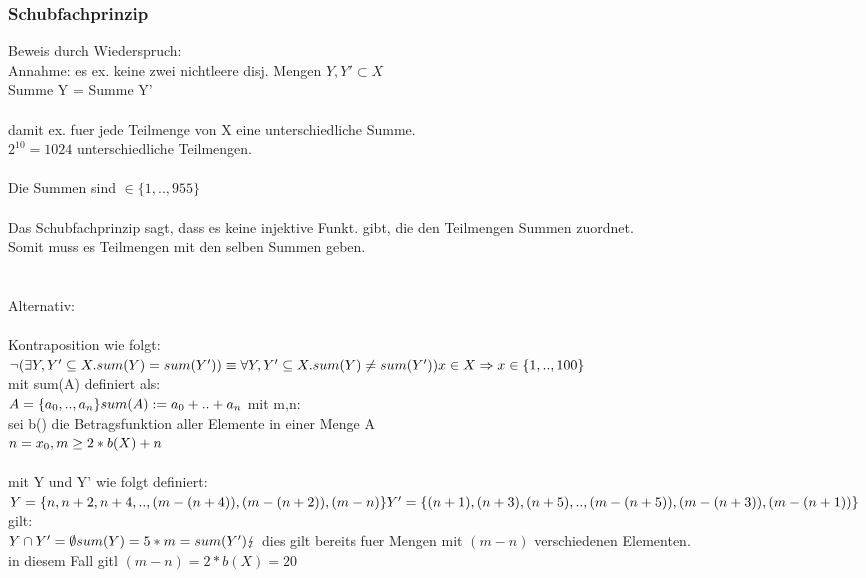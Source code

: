\documentclass{article}
\begin{document}
\subsubsection{Schubfachprinzip}
Beweis durch Wiederspruch:\\
Annahme: es ex. keine zwei nichtleere disj. Mengen $Y, Y' \subset X$\\
Summe Y = Summe Y'\\
\\
damit ex. fuer jede Teilmenge von X eine unterschiedliche Summe.\\
$2^{10} = 1024$ unterschiedliche Teilmengen.\\
\\
Die Summen sind $\in \{1,..,955\}$\\
\\
Das Schubfachprinzip sagt, dass es keine injektive Funkt. gibt, die den Teilmengen Summen zuordnet.\\
Somit muss es Teilmengen mit den selben Summen geben.
\\
\\
\\
Alternativ:\\
\\
Kontraposition wie folgt:
\\
$
        \neg (\exists Y,Y' \subseteq X. sum(Y) = sum(Y'))\\
\equiv  \forall Y,Y' \subseteq X. sum(Y) \neq sum(Y'))\\
\\
x \in X \Rightarrow x \in \{1,..,100\}\\
$
\\
mit sum(A) definiert als:\\
$
A = \{a_0, .. ,a_n\}\\
sum(A) := a_0 + .. + a_n\\
$
mit m,n:\\
sei b() die Betragsfunktion aller Elemente in einer Menge A\\
$
n = x_0,\\
m \geq 2 * b(X) + n\\
$
\\
\\
mit Y und Y' wie folgt definiert:\\
$
Y   = \{n, n+2, n+4, .. , (m-(n+4)), (m-(n+2)), (m-n)\}\\
Y'  = \{(n+1), (n+3), (n+5), .. , (m-(n+5)), (m-(n+3)), (m-(n+1))\}\\
$gilt:\\$
Y \cap Y' = \emptyset\\
sum(Y) = 5 * m = sum (Y') \lightning\ \\
$
dies gilt bereits fuer Mengen mit $(m-n)$ verschiedenen Elementen.\\
in diesem Fall gitl $(m-n) = 2 * b(X) = 20$\ \\
\end{document}
